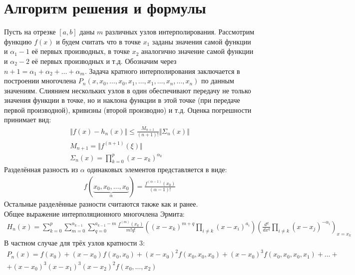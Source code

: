 \documentclass[10pt]{scrartcl}
\begin{document}
\section*{Алгоритм решения и формулы}\noindent
Пусть на отрезке $[a, b]$ даны $m$ различных узлов интерполирования. Рассмотрим функцию $f(x)$ и
будем считать что в точке $x_1$ заданы значения самой функции и $\alpha_1 - 1$ её первых производных,
в точке $x_2$ аналогично значение самой функции и $\alpha_2 - 2$ её первых производных и т.д.
Обозначим через $n + 1 = \alpha_1 + \alpha_2 + \dots + \alpha_m$. Задача кратного интерполирования
заключается в построении многочлена $P_n(x, x_0, \dots, x_0, x_1, \dots, x_1, \dots, x_n, \dots, x_n)
$ по данным значениям. Слиянием нескольких узлов в один обеспечивают передачу не только значения
функции в точке, но и наклона функции в этой точке (при передаче первой производной), кривизны
(второй производно) и т.д.
Оценка погрешности принимает вид:
\begin{gather*}
\Vert f(x) - h_n(x) \Vert \leq \frac{M_{n + 1}}{(n + 1)!} \Vert\Sigma_n(x)\Vert\\
M_{n + 1} = \Vert f^{(n+1)}(\xi)\Vert\\
\Sigma_n(x)=\prod_{k=0}^{p}(x - x_k)^{\alpha_k}
\end{gather*}
Разделённая разность из $\alpha$ одинаковых элементов представляется в виде:
\begin{gather*}
f(\underbrace{x_0, x_0, \dots, x_0}_{\alpha}) = \frac{f^{(\alpha - 1)}(x_0)}
{(\alpha - 1)!}
\end{gather*}
Остальные разделённые разности считаются также как и ранее.\\
Общее выражение интерполяционного многочлена Эрмита:
\begin{gather*}
H_n(x) = \sum_{k = 0}^p \sum_{m = 0}^{\alpha_{k - 1}} \sum_{q = 0}^{a_{k - 1} - m}
\frac{f^{(m)}(x_k)}{m!q!}\left( (x - x_k)^{m  + q}\prod_{i \neq k}(x - x_i)^{a_i}\right)
\left(\frac{d^q}{dx^q}\prod_{i \neq k}(x - x_j)^{-\alpha_i}\right)_{x=x_k}
\end{gather*}
В частном случае для трёх узлов кратности 3:
\begin{gather*}
P_n(x) = f(x_0) + (x - x_0)f(x_0, x_0) + (x - x_0)^2f(x_0, x_0, x_0) +
(x - x_0)^3f(x_0, x_0, x_0, x_1) + \dots + \\ +(x - x_0)^3(x - x_1)^3(x - x_2)^2
f(x_0, \dots, x_2)
\end{gather*}
\end{document}
